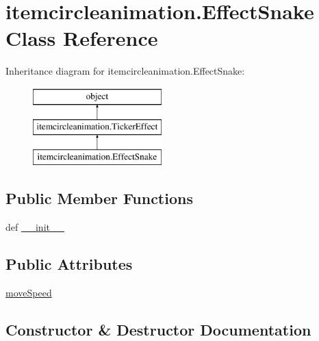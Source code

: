 \hypertarget{classitemcircleanimation_1_1EffectSnake}{}\section{itemcircleanimation.\+Effect\+Snake Class Reference}
\label{classitemcircleanimation_1_1EffectSnake}
Inheritance diagram for itemcircleanimation.\+Effect\+Snake\+:\begin{figure}[H]
\begin{center}
\leavevmode
\includegraphics[height=3.000000cm]{classitemcircleanimation_1_1EffectSnake}
\end{center}
\end{figure}
\subsection*{Public Member Functions}
\begin{DoxyCompactItemize}
\item 
def \hyperlink{classitemcircleanimation_1_1EffectSnake_ae2dc601f3734388770a4f7016cd15fbf}{\+\_\+\+\_\+init\+\_\+\+\_\+}
\end{DoxyCompactItemize}
\subsection*{Public Attributes}
\begin{DoxyCompactItemize}
\item 
\hyperlink{classitemcircleanimation_1_1EffectSnake_af7a41e5632f696c91dd7cfb9a70261e8}{move\+Speed}
\end{DoxyCompactItemize}


\subsection{Constructor \& Destructor Documentation}
\hypertarget{classitemcircleanimation_1_1EffectSnake_ae2dc601f3734388770a4f7016cd15fbf}{}

